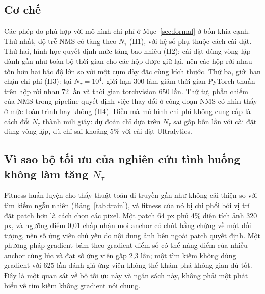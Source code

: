 \documentclass[a4paper,fleqn]{cas-dc}
\newcommand{\Ntau}{N_{\tau}}
\begin{document}
\subsection{Cơ chế}
Các phép đo phù hợp với mô hình chi phí ở Mục~\ref{sec:formal} ở bốn khía cạnh. Thứ nhất, độ trễ NMS có tăng theo $\Ntau$ (H1), với hệ số phụ thuộc cách cài đặt. Thứ hai, hình học quyết định mức tăng bao nhiêu (H2): cài đặt dùng vòng lặp dành gần như toàn bộ thời gian cho các hộp được giữ lại, nên các hộp rời nhau tốn hơn hai bậc độ lớn so với một cụm dày đặc cùng kích thước. Thứ ba, giới hạn chặn chi phí (H3): tại $\Ntau=10^4$, giới hạn 300 làm giảm thời gian PyTorch thuần trên hộp rời nhau 72 lần và thời gian torchvision 650 lần. Thứ tư, phần chiếm của NMS trong pipeline quyết định việc thay đổi ở công đoạn NMS có nhìn thấy ở mức toàn trình hay không (H4). Điều mà mô hình chi phí không cung cấp là cách đổi $\Ntau$ thành mili giây: dự đoán chỉ dựa trên $\Ntau$ sai gấp bốn lần với cài đặt dùng vòng lặp, dù chỉ sai khoảng 5\% với cài đặt Ultralytics.

\subsection{Vì sao bộ tối ưu của nghiên cứu tình huống không làm tăng $\Ntau$}
Fitness huấn luyện cho thấy thuật toán di truyền gần như không cải thiện so với tìm kiếm ngẫu nhiên (Bảng~\ref{tab:train}), và fitness của nó bị chi phối bởi vị trí đặt patch hơn là cách chọn các pixel. Một patch 64 px phủ 4\% diện tích ảnh 320 px, và ngưỡng điểm 0,01 chấp nhận mọi anchor có chút bằng chứng về một đối tượng, nên số ứng viên chủ yếu do nội dung ảnh bên ngoài patch quyết định. Một phương pháp gradient bám theo gradient điểm số có thể nâng điểm của nhiều anchor cùng lúc và đạt số ứng viên gấp 2,3 lần; một tìm kiếm không dùng gradient với 625 lần đánh giá ứng viên không thể khám phá không gian đủ tốt. Đây là một quan sát về bộ tối ưu này và ngân sách này, không phải một phát biểu về tìm kiếm không gradient nói chung.
\end{document}
